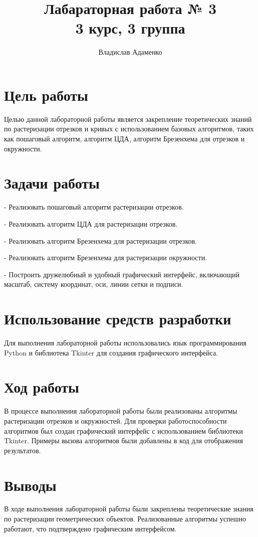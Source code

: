 \documentclass{article}
\begin{document}
    \title{Лабараторная работа № 3\\ 3 курс, 3 группа}
    \author{Владислав Адаменко}
    \maketitle

    \section{Цель работы}
    Целью данной лабораторной работы является закрепление теоретических знаний по растеризации отрезков и кривых с использованием базовых алгоритмов, таких как пошаговый алгоритм, алгоритм ЦДА, алгоритм Брезенхема для отрезков и окружности.

    \section{Задачи работы}
    - Реализовать пошаговый алгоритм растеризации отрезков.

    - Реализовать алгоритм ЦДА для растеризации отрезков.

    - Реализовать алгоритм Брезенхема для растеризации отрезков.

    - Реализовать алгоритм Брезенхема для растеризации окружности.

    - Построить дружелюбный и удобный графический интерфейс, включающий масштаб, систему координат, оси, линии сетки и подписи.

    \section{Использование средств разработки}
    Для выполнения лабораторной работы использовались язык программирования Python и библиотека Tkinter для создания графического интерфейса.

    \section{Ход работы}
    В процессе выполнения лабораторной работы были реализованы алгоритмы растеризации отрезков и окружностей. Для проверки работоспособности алгоритмов был создан графический интерфейс с использованием библиотеки Tkinter. Примеры вызова алгоритмов были добавлены в код для отображения результатов.

    \section{Выводы}
    В ходе выполнения лабораторной работы были закреплены теоретические знания по растеризации геометрических объектов. Реализованные алгоритмы успешно работают, что подтверждено графическим интерфейсом.
\end{document}
